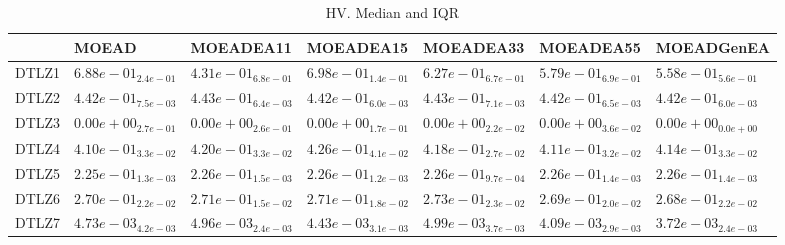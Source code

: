 \documentclass{article}
\begin{document}
\begin{table}
\caption{HV. Median and IQR}
\label{table:median.HV}
\begin{scriptsize}
\centering
\begin{tabular}{lllllll}
\hline & MOEAD & MOEADEA11 & MOEADEA15 & MOEADEA33 & MOEADEA55 &  MOEADGenEA\\
\hline
DTLZ1 & \cellcolor{gray25}$  6.88e-01_{ 2.4e-01}$ & $  4.31e-01_{ 6.8e-01}$ & \cellcolor{gray95}$  6.98e-01_{ 1.4e-01}$ & $  6.27e-01_{ 6.7e-01}$ & $  5.79e-01_{ 6.9e-01}$ & $  5.58e-01_{ 5.6e-01}$ \\
DTLZ2 & $  4.42e-01_{ 7.5e-03}$ & \cellcolor{gray25}$  4.43e-01_{ 6.4e-03}$ & $  4.42e-01_{ 6.0e-03}$ & \cellcolor{gray95}$  4.43e-01_{ 7.1e-03}$ & $  4.42e-01_{ 6.5e-03}$ & $  4.42e-01_{ 6.0e-03}$ \\
DTLZ3 & $  0.00e+00_{ 2.7e-01}$ & $  0.00e+00_{ 2.6e-01}$ & $  0.00e+00_{ 1.7e-01}$ & $  0.00e+00_{ 2.2e-02}$ & $  0.00e+00_{ 3.6e-02}$ & $  0.00e+00_{ 0.0e+00}$ \\
DTLZ4 & $  4.10e-01_{ 3.3e-02}$ & \cellcolor{gray25}$  4.20e-01_{ 3.3e-02}$ & \cellcolor{gray95}$  4.26e-01_{ 4.1e-02}$ & $  4.18e-01_{ 2.7e-02}$ & $  4.11e-01_{ 3.2e-02}$ & $  4.14e-01_{ 3.3e-02}$ \\
DTLZ5 & $  2.25e-01_{ 1.3e-03}$ & \cellcolor{gray25}$  2.26e-01_{ 1.5e-03}$ & $  2.26e-01_{ 1.2e-03}$ & $  2.26e-01_{ 9.7e-04}$ & \cellcolor{gray95}$  2.26e-01_{ 1.4e-03}$ & $  2.26e-01_{ 1.4e-03}$ \\
DTLZ6 & $  2.70e-01_{ 2.2e-02}$ & \cellcolor{gray25}$  2.71e-01_{ 1.5e-02}$ & $  2.71e-01_{ 1.8e-02}$ & \cellcolor{gray95}$  2.73e-01_{ 2.3e-02}$ & $  2.69e-01_{ 2.0e-02}$ & $  2.68e-01_{ 2.2e-02}$ \\
DTLZ7 & $  4.73e-03_{ 4.2e-03}$ & \cellcolor{gray25}$  4.96e-03_{ 2.4e-03}$ & $  4.43e-03_{ 3.1e-03}$ & \cellcolor{gray95}$  4.99e-03_{ 3.7e-03}$ & $  4.09e-03_{ 2.9e-03}$ & $  3.72e-03_{ 2.4e-03}$ \\
\hline
\end{tabular}
\end{scriptsize}
\end{table}
\
\end{document}
